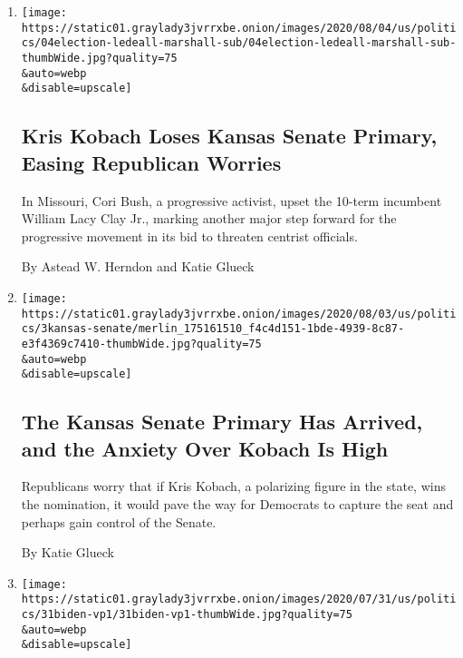 \begin{enumerate}
\def\labelenumi{\arabic{enumi}.}
\item
  \href{/2020/08/04/us/politics/kobach-tlaib.html}{}

  \texttt{[image: https://static01.graylady3jvrrxbe.onion/images/2020/08/04/us/politics/04election-ledeall-marshall-sub/04election-ledeall-marshall-sub-thumbWide.jpg?quality=75\\\&auto=webp\\\&disable=upscale]}

  \hypertarget{kris-kobach-loses-kansas-senate-primary-easing-republican-worries}{%
  \subsection{Kris Kobach Loses Kansas Senate Primary, Easing Republican
  Worries}\label{kris-kobach-loses-kansas-senate-primary-easing-republican-worries}}

  In Missouri, Cori Bush, a progressive activist, upset the 10-term
  incumbent William Lacy Clay Jr., marking another major step forward
  for the progressive movement in its bid to threaten centrist
  officials.

  By Astead W. Herndon and Katie Glueck
\item
  \href{/2020/08/03/us/politics/kris-kobach-kansas-senate-primary.html}{}

  \texttt{[image: https://static01.graylady3jvrrxbe.onion/images/2020/08/03/us/politics/3kansas-senate/merlin\_175161510\_f4c4d151-1bde-4939-8c87-e3f4369c7410-thumbWide.jpg?quality=75\\\&auto=webp\\\&disable=upscale]}

  \hypertarget{the-kansas-senate-primary-has-arrived-and-the-anxiety-over-kobach-is-high}{%
  \subsection{The Kansas Senate Primary Has Arrived, and the Anxiety
  Over Kobach Is
  High}\label{the-kansas-senate-primary-has-arrived-and-the-anxiety-over-kobach-is-high}}

  Republicans worry that if Kris Kobach, a polarizing figure in the
  state, wins the nomination, it would pave the way for Democrats to
  capture the seat and perhaps gain control of the Senate.

  By Katie Glueck
\item
  \href{/2020/07/31/us/politics/joseph-biden-vice-president.html}{}

  \texttt{[image: https://static01.graylady3jvrrxbe.onion/images/2020/07/31/us/politics/31biden-vp1/31biden-vp1-thumbWide.jpg?quality=75\\\&auto=webp\\\&disable=upscale]}


\end{enumerate}
